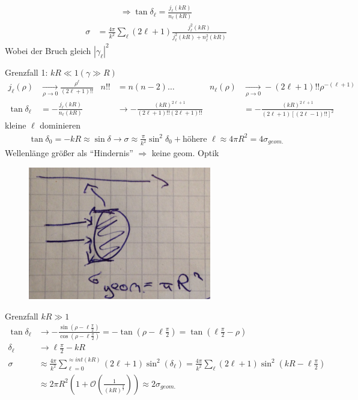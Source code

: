 		\begin{align*}
		\Rightarrow \boxed{\tan \delta_\ell = \frac{j_\ell (kR)}{n_\ell (kR)}}
		\end{align*}
		\begin{align*}
			\sigma &= \frac{4 \pi}{k^2} \sum_{\ell} (2\ell +1) 
			\frac{j_\ell^2 (kR)}{j_\ell^2 (kR)+ n_\ell^2 (kR)}
		\end{align*}
	Wobei der Bruch gleich $|\gamma_\ell|^2$
	
	Grenzfall 1: $kR \ll 1 (\gamma \gg R)$
		\begin{align*}
			j_\ell (\rho) &\underset{\rho \rightarrow 0}{\rightarrow} \frac{\rho^\ell}{(2\ell+1)!!}
			& n!! &= n(n-2) \ldots 
			& n_\ell (\rho) &\underset{\rho \rightarrow 0}{\rightarrow}
			-(2\ell + 1) !! \rho^{-(\ell +1)} \\
			\tan \delta_\ell &= -\frac{j_\ell (kR)}{n_\ell (kR)} &
			&\rightarrow - \frac{(kR)^{2\ell+1}}{(2\ell +1)!! (2\ell+1)!!} 
			& &= -\frac{(kR)^{2 \ell +1}}{(2\ell +1) [(2 \ell -1)!!]^2}
		\end{align*}
	kleine $\ell$ dominieren
		\begin{align*}
			\tan \delta_0 = - kR \approx \sin \delta \rightarrow 
			\sigma \approx \frac{\pi}{k^2} \sin^2\delta_0 + \text{höhere } \ell 
			\approx 4 \pi R^2 = 4 \sigma_{geom.}
 		\end{align*}
	Wellenlänge größer als ``Hindernis'' $\Rightarrow$ keine geom. Optik 
	\begin{figure} [h]
		\begin{center}
			\includegraphics[width=8cm]{Annaherung_harte_Kugel1}
		\end{center}
	\end{figure}
 Grenzfall $kR \gg1$
		\begin{align*}
			\tan \delta_\ell &\rightarrow - \frac{\sin (\rho-\ell \frac{\pi}{2})}{\cos (\rho-\ell \frac{\pi}{2})} 
			= -\tan (\rho-\ell \frac{\pi}{2}) = \tan(\ell \frac{\pi}{2} - \rho) \\
			\delta_\ell &\rightarrow \ell \frac{\pi}{2}- kR\\
			\sigma &\approx \frac{4 \pi}{k^2} \sum_{\ell =0}^{\approx int(kR)}
			(2 \ell + 1) \sin^2(\delta_\ell) 
			= \frac{4\pi}{k^2} \sum_\ell (2 \ell + 1) \sin^2(kR- \ell \frac{\pi}{2}) \\
			&\approx 2 \pi R^2 
			\left(
			1+ \mathscr{O} \left(\frac{1}{(kR)^{\frac{2}{3}}}\right)
			\right)		
			\approx 2 \sigma_{geom.}
		\end{align*}
